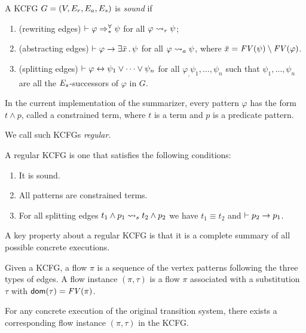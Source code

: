 \documentclass{beamer}
\begin{document}
\begin{frame}
\begin{definition}
A KCFG $G = (V, E_r, E_a, E_s)$ is \emph{sound} if
\begin{enumerate}
\item (rewriting edges) $\vdash \varphi \Rightarrow^{\forall}_{*} \psi$ for all $\varphi \rightsquigarrow_r \psi$;
\item (abstracting edges) 
   $\vdash \varphi \rightarrow \exists \bar{x} \,.\, \psi$ for all $\varphi \rightsquigarrow_a \psi$,
   where $\bar{x} = \mathit{FV(\psi)} \setminus \mathit{FV(\varphi)}$.
\item (splitting edges) $\vdash \varphi \leftrightarrow \psi_1 \lor \dots \lor \psi_n$
 for all $\varphi_,\psi_1,\dots,\psi_n$ such that
 $\psi_1,\dots,\psi_n$ are all the $E_s$-successors of $\varphi$ in $G$.
\end{enumerate}
\end{definition}

In the current implementation of the \K summarizer, every 
pattern $\varphi$ 
has the form $t \land p$, called a constrained term,
where $t$ is a term
and $p$ is a predicate pattern.

We call such KCFGs \emph{regular}. 
\end{frame}

\begin{frame}
\begin{definition}
A regular KCFG is one that satisfies the following conditions:
\begin{enumerate}
\item It is sound.
\item All patterns are constrained terms. 
\item For all splitting edges
      $t_1 \land p_1 \rightsquigarrow_s t_2 \land p_2$ we have
      $t_1 \equiv t_2$ and $\vdash p_2 \rightarrow p_1$.
\end{enumerate}
\end{definition}
A key property about a regular KCFG is that it is a complete summary
of all possible concrete executions.
\end{frame}

\begin{frame}

\begin{definition}
Given a KCFG, 
a flow $\pi$ is a sequence of the vertex patterns
following the three types of edges.
A flow instance $(\pi, \tau)$
is a flow $\pi$ associated with a substitution $\tau$
with $\mathsf{dom}(\tau) = \mathit{FV(\pi)}$.
\end{definition}
\begin{theorem}
For any concrete execution of the original transition system,
there exists a corresponding flow instance
$(\pi,\tau)$ in the KCFG. 
\end{theorem}
\end{frame}
\end{document}
